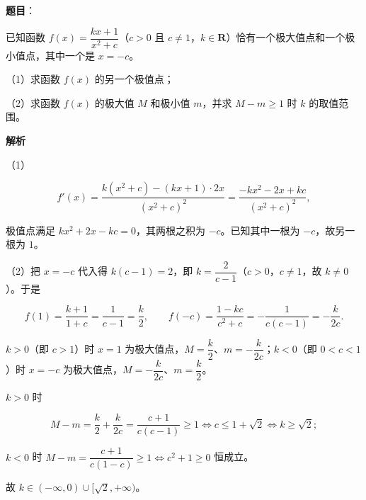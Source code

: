 \begin{answer}

\textbf{题目}：

已知函数 $f(x)=\dfrac{kx+1}{x^2+c}$（$c>0$ 且 $c\neq1$，$k\in\mathbf R$）恰有一个极大值点和一个极小值点，其中一个是 $x=-c$。

（1）求函数 $f(x)$ 的另一个极值点；

（2）求函数 $f(x)$ 的极大值 $M$ 和极小值 $m$，并求 $M-m\geqslant1$ 时 $k$ 的取值范围。

\textbf{解析}

（1）

\nopagebreak[4]
\[f'(x)=\frac{k(x^2+c)-(kx+1)\cdot2x}{(x^2+c)^2}=\frac{-kx^2-2x+kc}{(x^2+c)^2},\]

极值点满足 $kx^2+2x-kc=0$，其两根之积为 $-c$。已知其中一根为 $-c$，故另一根为 $1$。

（2）把 $x=-c$ 代入得 $k(c-1)=2$，即 $k=\dfrac2{c-1}$（$c>0$，$c\neq1$，故 $k\neq0$）。于是

\nopagebreak[4]
\[f(1)=\frac{k+1}{1+c}=\frac1{c-1}=\frac k2,\qquad f(-c)=\frac{1-kc}{c^2+c}=-\frac1{c(c-1)}=-\frac k{2c}.\]

$k>0$（即 $c>1$）时 $x=1$ 为极大值点，$M=\dfrac k2$、$m=-\dfrac k{2c}$；$k<0$（即 $0<c<1$）时 $x=-c$ 为极大值点，$M=-\dfrac k{2c}$、$m=\dfrac k2$。

$k>0$ 时

\nopagebreak[4]
\[M-m=\frac k2+\frac k{2c}=\frac{c+1}{c(c-1)}\geqslant1\iff c\leqslant1+\sqrt2\iff k\geqslant\sqrt2;\]

$k<0$ 时 $M-m=\dfrac{c+1}{c(1-c)}\geqslant1\iff c^2+1\geqslant0$ 恒成立。

故 $k\in(-\infty,0)\cup[\sqrt2,+\infty)$。

\gkanswer{答案：（1）$x=1$；（2）$M$、$m$ 分别是 $\dfrac k2$ 与 $-\dfrac k{2c}$ 中的较大者与较小者，$k\in(-\infty,0)\cup[\sqrt2,+\infty)$。}

\end{answer}
